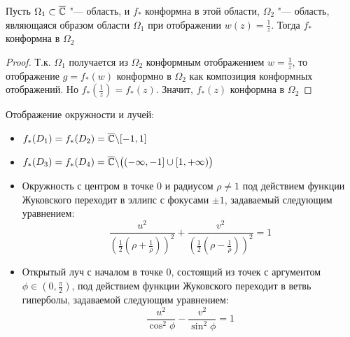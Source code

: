 \begin{proposition}
	Пусть $\Omega_1 \subset \overline{\mathbb{C}}$ "--- область, и $f_*$ конформна в этой области, $\Omega_2$ "--- область, являющаяся образом области $\Omega_1$ при отображении $w(z) = \frac 1z$. Тогда $f_*$ конформна в $\Omega_2$
\end{proposition}

\begin{proof}
    Т.к. $\Omega_1$ получается из $\Omega_2$ конформным отображением $w = \frac{1}{z}$, то отображение $g = f_*(w)$ конформно в $\Omega_2$ как композиция конформных отображений. Но $f_*(\frac{1}{z}) = f_*(z)$. Значит, $f_*(z)$ конформна в $\Omega_2$
\end{proof}

\begin{proposition}
Отображение окружности и лучей:

\begin{itemize}
    \item $f_*(D_1) = f_*(D_2) = \overline{\mathbb{C}} \backslash [-1, 1]$
    \item $f_*(D_3) = f_*(D_4) = \overline{\mathbb{C}} \backslash \big((-\infty, -1] \cup [1, +\infty)\big)$
    \item Окружность с центром в точке $0$ и радиусом $\rho \ne 1$ под действием функции Жуковского переходит в эллипс с фокусами $\pm 1$, задаваемый следующим уравнением:
    \[\frac{u^2}{\left(\frac12\left(\rho + \frac 1\rho\right)\right)^2} + \frac{v^2}{\left(\frac12\left(\rho - \frac 1\rho\right)\right)^2} = 1\]
    \item Открытый луч с началом в точке $0$, состоящий из точек с аргументом $\phi \in \left(0, \frac\pi 2\right)$, под действием функции Жуковского переходит в ветвь гиперболы, задаваемой следующим уравнением:
    \[\frac{u^2}{\cos^2\phi} - \frac{v^2}{\sin^2\phi} = 1\]
\end{itemize}
\end{proposition}
